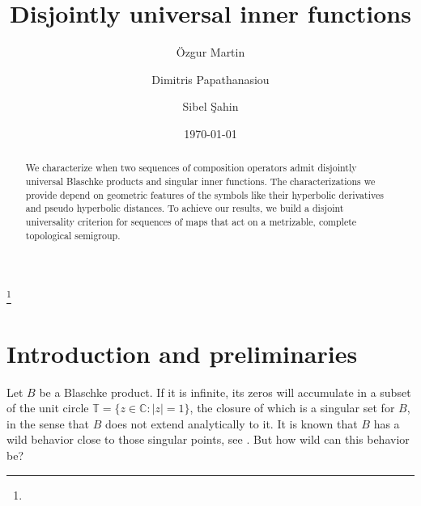 \documentclass[12pt,a4paper]{amsart}
\theoremstyle{plain}
\theoremstyle{definition}
\theoremstyle{remark}
\theoremstyle{fact}
\begin{document}

\date{\today}

\title{Disjointly universal inner functions}

\author[\"O. Martin]{\"Ozgur Martin}

\author[D. Papathanasiou]{Dimitris Papathanasiou}

\author[S. \c{S}ahin]{Sibel \c{S}ahin}

\address{\"Ozgur Martin\\
Department of Mathematics, Mimar Sinan Fine Arts University, Istanbul, T\"urkiye}

\address{Dimitris Papathanasiou\\
Sabanci University Tuzla Campus, Orta Mahalle, \"Universite
Cadesi No:27 Tuzla, 34956 Istanbul, Turkey}

\address{Sibel \c{S}ahin\\
Department of Mathematics, Mimar Sinan Fine Arts University, Istanbul, T\"urkiye}
\thanks{}






\begin{abstract} 
We characterize when two sequences of composition operators admit disjointly universal Blaschke products and singular inner functions. The characterizations we provide depend on geometric features of the symbols like their hyperbolic derivatives and pseudo hyperbolic distances. To achieve our results, we build a disjoint universality criterion for sequences of maps that act on a metrizable, complete topological semigroup.
\end{abstract}

\maketitle

\section{Introduction and preliminaries}

Let $B$ be a Blaschke product. If it is infinite, its zeros will accumulate in a subset of the unit circle $\mathbb{T}=\{z\in \mathbb{C}: |z|=1\}$, the closure of which is a singular set for $B$, in the sense that $B$ does not extend analytically to it. It is known that $B$ has a wild behavior close to those singular points, see \cite[Theorem 6.6]{ga}. But how wild can this behavior be? 
\end{document}
